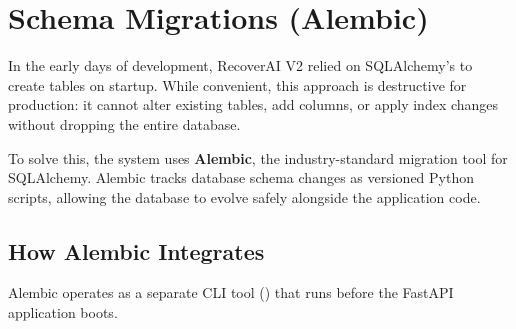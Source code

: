 
\section{Schema Migrations (Alembic)}

\begin{tcolorbox}[summarybox={\iconGear[1.5] Safely Evolving the Schema}]
\color{textdark}
In the early days of development, RecoverAI V2 relied on SQLAlchemy's  to create tables on startup. While convenient, this approach is destructive for production: it cannot alter existing tables, add columns, or apply index changes without dropping the entire database.

To solve this, the system uses \textbf{Alembic}, the industry-standard migration tool for SQLAlchemy. Alembic tracks database schema changes as versioned Python scripts, allowing the database to evolve safely alongside the application code.
\end{tcolorbox}

\vspace{0.8cm}

\subsection{How Alembic Integrates}

Alembic operates as a separate CLI tool () that runs before the FastAPI application boots. 

